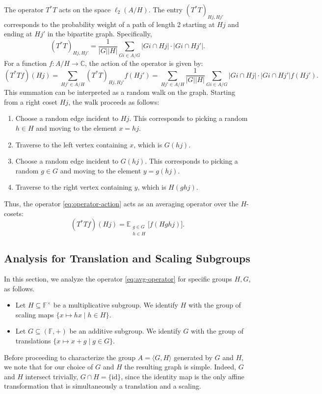 \documentclass[11pt]{article}
\theoremstyle{plain}
\theoremstyle{definition}
\begin{document}
The operator $T^* T$ acts on the space $\ell_2(A/H)$. The entry $(T^*T)_{Hj, Hj'}$ corresponds to the probability weight of a path of length 2 starting at $Hj$ and ending at $Hj'$ in the bipartite graph. Specifically,
\[
    (T^*T)_{Hj,Hj'} = \frac{1}{|G||H|} \sum_{Gi \in A/G} |Gi \cap Hj| \cdot |Gi \cap Hj'|.
\]
For a function $f: A/H \to \mathbb{C}$, the action of the operator is given by:
\begin{equation}
    \label{eq:operator-action}
    (T^*T f)(Hj) = \sum_{Hj'\in A/H} (T^*T)_{Hj,Hj'} f(Hj')
    = \sum_{Hj'\in A/H}
    \frac{1}{|G||H|} \sum_{Gi \in A/G} |Gi \cap Hj| \cdot |Gi \cap Hj'|
    f(Hj').
\end{equation}
This summation can be interpreted as a random walk on the graph. Starting from a right coset $Hj$, the walk proceeds as follows:
\begin{enumerate}
    \item Choose a random edge incident to $Hj$. This corresponds to picking a random $h \in H$ and moving to the element $x = hj$.
    \item Traverse to the left vertex containing $x$, which is $G(hj)$.
    \item Choose a random edge incident to $G(hj)$. This corresponds to picking a random $g \in G$ and moving to the element $y = g(hj)$.
    \item Traverse to the right vertex containing $y$, which is $H(ghj)$.
\end{enumerate}
Thus, the operator \eqref{eq:operator-action} acts as an averaging operator over the $H$-cosets:
\begin{equation}
    \label{eq:avg-operator}
    (T^* T f)(Hj) = \mathbb{E}_{\substack{g \in G \\ h \in H}} \big[ f(Hghj) \big].
\end{equation}

\subsection{Analysis for Translation and Scaling Subgroups}
In this section, we analyze the operator \eqref{eq:avg-operator} for specific groups $H,G$, as follows.

\begin{itemize}
    \item Let $H \subseteq \mathbb{F}^{\times}$ be a multiplicative subgroup. We identify $H$ with the group of scaling maps $\{x \mapsto hx \mid h \in H\}$.
    \item Let $G \subseteq (\mathbb{F}, +)$ be an additive subgroup. We identify $G$ with the group of translations $\{x \mapsto x+g \mid g \in G\}$.
\end{itemize}
Before proceeding to characterize the group $A=\langle G,H\rangle$ generated by $G$ and $H$, we note that for our choice of $G$ and $H$ the resulting graph is simple. Indeed, $G$ and $H$ intersect trivially, $
G\cap H=\{\mathrm{id}\}$,
since the identity map is the only affine transformation that is simultaneously a translation and a scaling.
 
\end{document}
